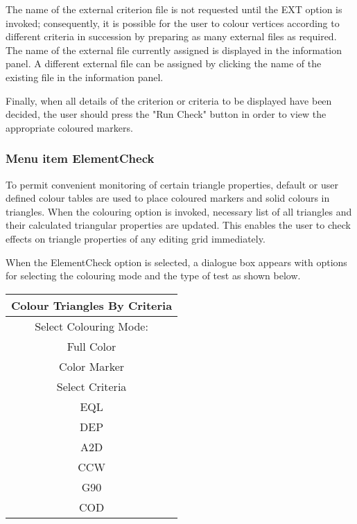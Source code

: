 \documentclass{article}
\begin{document}
The name of the external criterion file is not requested until the EXT option is invoked; consequently, it is possible for the user to colour vertices according to different criteria in succession by preparing as many external files as required. The name of the external file currently assigned is displayed in the information panel. A different external file can be assigned by clicking the name of the existing file in the information panel.

Finally, when all details of the criterion or criteria to be displayed have been decided, the user should press the "Run Check" button in order to view the appropriate coloured markers. %

\subsubsection{Menu item ElementCheck}

To permit convenient monitoring of certain triangle properties, default or user defined colour tables are used to place coloured markers and solid colours in triangles. When the colouring option is invoked, necessary list of all triangles and their calculated triangular properties are updated. This enables the user to check effects on triangle properties of any editing grid immediately.

When the ElementCheck option is selected, a dialogue box appears with options for selecting the colouring mode and the type of test as shown below.

\begin{center}
 \begin{tabular}{| c |}
\hline
Colour Triangles By Criteria\\
\hline
Select Colouring Mode:\\
\hline
\indent	Full Color\\
\indent	Color Marker\\
\hline
Select Criteria\\
\hline
\indent	EQL\\
\indent	DEP\\
\indent	A2D\\
\indent	CCW \\
\indent	G90\\
\indent	COD\\
\hline
 \end{tabular}
\end{center}
\end{document}
